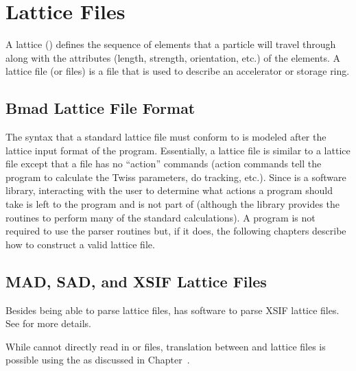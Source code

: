 \chapter{Lattice Files}
\label{c:lat.file}

A lattice () defines the sequence of elements that a particle will travel
through along with the attributes (length, strength, orientation, etc.) of the elements.  A lattice
file (or files) is a file that is used to describe an accelerator or storage ring.

\section{Bmad Lattice File Format}
\label{s:lattice.file.formats}

The syntax that a \bmad standard lattice file must conform to is modeled after the lattice input
format of the \mad program.  Essentially, a \bmad lattice file is similar to a \mad lattice file
except that a \bmad file has no ``action'' commands (action commands tell the program to calculate
the Twiss parameters, do tracking, etc.).  Since \bmad is a software library, interacting with the
user to determine what actions a program should take is left to the program and is not part of \bmad
(although the \bmad library provides the routines to perform many of the standard calculations). A
program is not required to use the \bmad parser routines but, if it does, the following chapters
describe how to construct a valid lattice file.

\section{MAD, SAD, and XSIF Lattice Files}
\label{s:mad.xsif}

Besides being able to parse \bmad lattice files, \bmad has software to
parse XSIF\cite{b:xsif} lattice files. See  for
more details.

While \bmad cannot directly read in \mad\cite{b:maduser} or
\cite{b:sad} files, translation between \mad and \bmad lattice
files is possible using the  as
discussed in Chapter~.

\newpage

